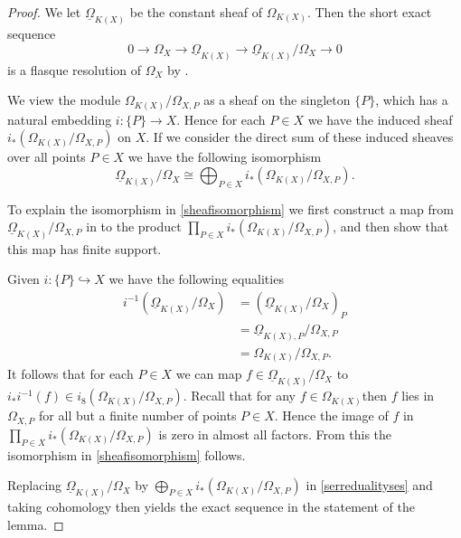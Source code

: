 \documentclass[draft, 11pt]{article} %
\theoremstyle{plain}
\theoremstyle{remark}
\begin{document}
\begin{proof}
We let $\underline{\Omega}_{K(X)}$ be the constant sheaf of $\Omega_{K(X)}$.
Then the short exact sequence
\begin{equation}\label{serredualityses}
0 \rightarrow \Omega_X \rightarrow \underline{\Omega}_{K(X)} \rightarrow \underline{\Omega}_{K(X)}/\Omega_X \rightarrow 0
\end{equation}
is a flasque resolution of $\Omega_X$ by \cite[Chap II, ex. 1.16]{hart}.

We view the module $\Omega_{K(X)}/\Omega_{X,P}$ as a sheaf on the singleton $\{P\}$, which has a natural embedding $i\colon \{P\} \rightarrow X$.
Hence for each $P\in X$ we have the induced sheaf $i_*\left(\Omega_{K(X)}/\Omega_{X,P}\right)$ on $X$.
If we consider the direct sum of these induced sheaves over all points $P\in X$ we have the following isomorphism
\begin{equation}\label{sheafisomorphism}
\underline{\Omega}_{K(X)}/\Omega_X\cong \bigoplus_{P\in X} i_*\left(\Omega_{K(X)}/\Omega_{X,P}\right).
\end{equation}


To explain the isomorphism in \eqref{sheafisomorphism} we first construct a map from $\underline{\Omega}_{K(X)}/\Omega_{X,P}$ in to the product $\prod_{P \in X} i_*\left(\Omega_{K(X)}/\Omega_{X,P}\right)$, and then show that this map has finite support.

Given $i\colon \{P\} \hookrightarrow X$ we have the following equalities
\begin{align*}
i^{-1}\left(\underline{\Omega}_{K(X)}/\Omega_X\right) & = \left(\underline{\Omega}_{K(X)}/\Omega_X\right)_P \\
& = \underline{\Omega}_{K(X),P}/\Omega_{X,P} \\
& = \Omega_{K(X)}/\Omega_{X,P}.
\end{align*}
It follows that for each $P \in X$ we can map $f \in \underline{\Omega}_{K(X)}/\Omega_X$ to $i_*i^{-1}(f) \in i_8 \left( \Omega_{K(X)}/\Omega_{X,P} \right)$.
Recall that for any $f \in \Omega_{K(X)}$then $f$ lies in $\Omega_{X,P}$ for all but a finite number of points $P \in X$.
Hence the image of $f$ in $\prod_{P \in X} i_*\left(\Omega_{K(X)}/\Omega_{X,P}\right)$ is zero in almost all factors.
From this the isomorphism in \eqref{sheafisomorphism} follows.

Replacing $\underline{\Omega}_{K(X)}/\Omega_X$ by $\bigoplus_{P\in X} i_*\left(\Omega_{K(X)}/\Omega_{X,P}\right)$ in \eqref{serredualityses} and taking cohomology then yields the exact sequence in the statement of the lemma.
\end{proof}
\end{document}
